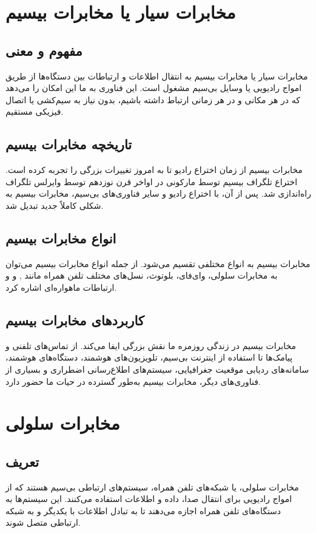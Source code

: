 \section*{
	مخابرات سیار یا مخابرات بیسیم
}

\subsection*{
	مفهوم و معنی
}
مخابرات سیار یا مخابرات بیسیم به انتقال اطلاعات و ارتباطات بین دستگاه‌ها از طریق امواج رادیویی یا وسایل بی‌سیم مشغول است. این فناوری به ما این امکان را می‌دهد که در هر مکانی و در هر زمانی ارتباط داشته باشیم، بدون نیاز به سیم‌کشی یا اتصال فیزیکی مستقیم.

\subsection{تاریخچه مخابرات بیسیم}
مخابرات بیسیم از زمان اختراع رادیو تا به امروز تغییرات بزرگی را تجربه کرده است. اختراع تلگراف بیسیم توسط مارکونی در اواخر قرن نوزدهم توسط وایرلس تلگراف راه‌اندازی شد. پس از آن، با اختراع رادیو و سایر فناوری‌های بی‌سیم، مخابرات بیسیم به شکلی کاملاً جدید تبدیل شد.

\subsection{انواع مخابرات بیسیم}
مخابرات بیسیم به انواع مختلفی تقسیم می‌شود. از جمله انواع مخابرات بیسیم می‌توان به مخابرات سلولی، وای‌فای، بلوتوث، نسل‌های مختلف تلفن همراه مانند , 
 و 
 و ارتباطات ماهواره‌ای اشاره کرد.

\subsection{کاربردهای مخابرات بیسیم}
مخابرات بیسیم در زندگی روزمره ما نقش بزرگی ایفا می‌کند. از تماس‌های تلفنی و پیامک‌ها تا استفاده از اینترنت بی‌سیم، تلویزیون‌های هوشمند، دستگاه‌های هوشمند، سامانه‌های ردیابی موقعیت جغرافیایی، سیستم‌های اطلاع‌رسانی اضطراری و بسیاری از فناوری‌های دیگر، مخابرات بیسیم به‌طور گسترده در حیات ما حضور دارد.

\section{
	مخابرات سلولی
}

\subsection{تعریف}
مخابرات سلولی، یا شبکه‌های تلفن همراه، سیستم‌های ارتباطی بی‌سیم هستند که از امواج رادیویی برای انتقال صدا، داده و اطلاعات استفاده می‌کنند. این سیستم‌ها به دستگاه‌های تلفن همراه اجازه می‌دهند تا به تبادل اطلاعات با یکدیگر و به شبکه ارتباطی متصل شوند.

